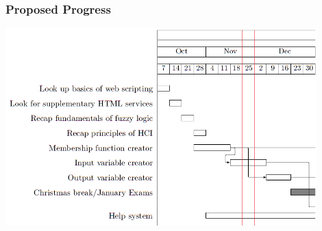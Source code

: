 \documentclass{beamer}
\begin{document}
\begin{frame}
 \frametitle{Proposed Progress}
 \begin{center}
 \includegraphics[width=0.9\textwidth]{images/GANTTONE.png}
 \end{center}
\end{frame}
\end{document}
